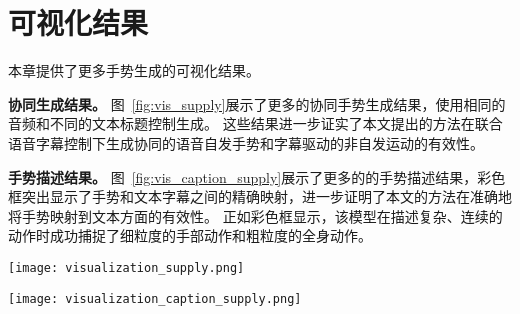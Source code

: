 
\chapter{可视化结果}
\label{sec:appendix_vis}
本章提供了更多手势生成的可视化结果。

\textbf{协同生成结果。}
图~\ref{fig:vis_supply}展示了更多的协同手势生成结果，使用相同的音频和不同的文本标题控制生成。
这些结果进一步证实了本文提出的方法在联合语音字幕控制下生成协同的语音自发手势和字幕驱动的非自发运动的有效性。

\textbf{手势描述结果。}
图~\ref{fig:vis_caption_supply}展示了更多的的手势描述结果，彩色框突出显示了手势和文本字幕之间的精确映射，进一步证明了本文的方法在准确地将手势映射到文本方面的有效性。
正如彩色框显示，该模型在描述复杂、连续的动作时成功捕捉了细粒度的手部动作和粗粒度的全身动作。

\begin{figure*}[t]
  \centering
  \texttt{[image: visualization\_supply.png]}
  \caption{更多协同手势生成结果。}
  \label{fig:vis_supply}
\end{figure*}

\begin{figure*}[t]
  \centering
  \texttt{[image: visualization\_caption\_supply.png]}
  \caption{更多手势描述结果。}%
  \label{fig:vis_caption_supply}
\end{figure*}









